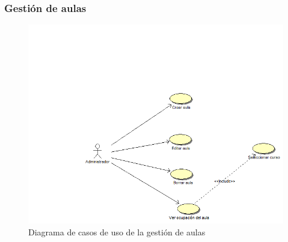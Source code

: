 \documentclass{book}
\begin{document}
\subsubsection{Gestión de aulas}
\begin{figure}[H] 
  \label{gestion-aulas} 
	\begin{center}
    \includegraphics[scale=0.5]{./gestionaulas.png}
  \end{center}
\caption{Diagrama de casos de uso de la gestión de aulas}
\end{figure}
\end{document}
